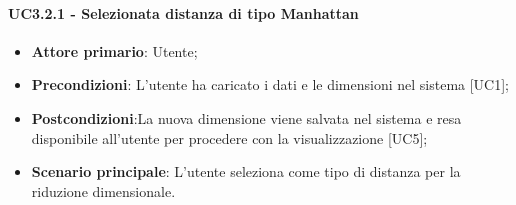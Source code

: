 \paragraph{UC3.2.1 - Selezionata distanza di tipo Manhattan}
\begin{itemize}
	\item \textbf{Attore primario}: Utente;
	\item \textbf{Precondizioni}: L'utente ha caricato i dati e le dimensioni nel sistema [UC1];
	\item \textbf{Postcondizioni}:La nuova dimensione viene salvata nel sistema e resa disponibile all'utente per procedere con la visualizzazione [UC5];
	\item \textbf{Scenario principale}: L'utente seleziona  come tipo di distanza per la riduzione dimensionale.
\end{itemize}